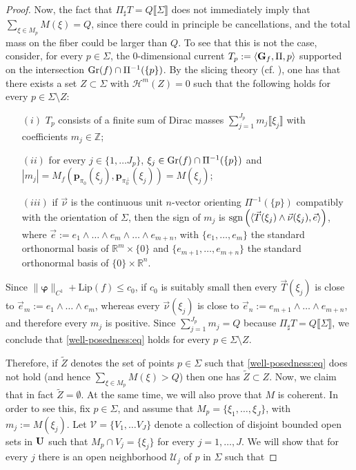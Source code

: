 \documentclass[a4paper,11pt,reqno]{amsart}
\theoremstyle{definition}
\numberwithin{equation}{section}
\numberwithin{subsection}{section}
\newcommand{\Z}{\mathbb{Z}}
\newcommand{\R}{\mathbb{R}}
\newcommand{\U}{\mathcal{U}}
\newcommand{\Lip}{\mathrm{Lip}}
\newcommand{\Ha}{\mathcal{H}}
\newcommand{\bphi}{\boldsymbol{\varphi}}
\newcommand{\p}{\mathbf{p}}
\begin{document}
\begin{proof}
Now, the fact that $\Pi_{\sharp}T = Q \llbracket \Sigma \rrbracket$ does not immediately imply that $\sum_{\xi \in M_p} M(\xi) = Q$, since there could in principle be cancellations, and the total mass on the fiber could be larger than $Q$. To see that this is not the case, consider, for every $p \in \Sigma$, the $0$-dimensional current $T_{p} := \langle {\bf G}_{f}, \Pi, p \rangle$ supported on the intersection ${\rm Gr}(f) \cap \Pi^{-1}(\{p\})$. By the slicing theory (cf. \cite[Section 4.3]{Federer69}), one has that there exists a set $Z \subset \Sigma$ with $\Ha^{m}(Z) = 0$ such that the following holds for every $p \in \Sigma \setminus Z$:
\begin{itemize}
\item[$(i)$] $T_{p}$ consists of a finite sum of Dirac masses $\sum_{j=1}^{J_p} m_{j} \llbracket \xi_{j} \rrbracket$ with coefficients $m_{j} \in \Z$;
\item[$(ii)$] for every $j \in \lbrace 1, \dots J_{p} \rbrace$, $\xi_{j} \in {\rm Gr}(f) \cap \Pi^{-1}(\{p\})$ and $|m_{j}| = M_{f}(\p_{\pi_{0}}(\xi_j), \p_{\pi_{0}^{\perp}}(\xi_j)) = M(\xi_j)$;
\item[$(iii)$] if $\vec{\nu}$ is the continuous unit $n$-vector orienting $\Pi^{-1}(\{p\})$ compatibly with the orientation of $\Sigma$, then the sign of $m_{j}$ is ${\rm sgn}\left( \langle \vec{T}(\xi_j) \wedge \vec{\nu}(\xi_j), \vec{e} \rangle \right)$, where $\vec{e} := e_{1} \wedge \dots \wedge e_{m} \wedge \dots \wedge e_{m+n}$, with $\{e_{1}, \dots, e_{m}\}$ the standard orthonormal basis of $\R^{m} \times \{0\}$ and $\{e_{m+1}, \dots, e_{m+n}\}$ the standard orthonormal basis of $\{0\} \times \R^{n}$.
\end{itemize}
Since $\| \bphi \|_{C^{1}} + \Lip(f) \leq c_{0}$, if $c_{0}$ is suitably small then every $\vec{T}(\xi_{j})$ is close to $\vec{e}_{m} := e_{1} \wedge \dots \wedge e_{m}$, whereas every $\vec{\nu}(\xi_j)$ is close to $\vec{e}_{n} := e_{m+1} \wedge \dots \wedge e_{m+n}$, and therefore every $m_{j}$ is positive. Since $\sum_{j=1}^{J_p} m_{j} = Q$ because $\Pi_{\sharp}T = Q \llbracket \Sigma \rrbracket$, we conclude that \eqref{well-posedness:eq} holds for every $p \in \Sigma \setminus Z$.

Therefore, if $\tilde{Z}$ denotes the set of points $p \in \Sigma$ such that \eqref{well-posedness:eq} does not hold (and hence $\sum_{\xi \in M_{p}} M(\xi) > Q$) then one has $\tilde{Z} \subset Z$. Now, we claim that in fact $\tilde{Z} = \emptyset$. At the same time, we will also prove that $M$ is coherent. In order to see this, fix $p \in \Sigma$, and assume that $M_{p} = \{ \xi_{1}, \dots, \xi_{J} \}$, with $m_{j} := M(\xi_{j})$. Let $\mathcal{V} = \{V_{1}, \dots V_{J} \}$ denote a collection of disjoint bounded open sets in ${\bf U}$ such that $M_{p} \cap V_{j} = \{\xi_{j}\}$ for every $j = 1,\dots,J$. We will show that for every $j$ there is an open neighborhood $\U_{j}$ of $p$ in $\Sigma$ such that
%


\end{proof}
\end{document}
